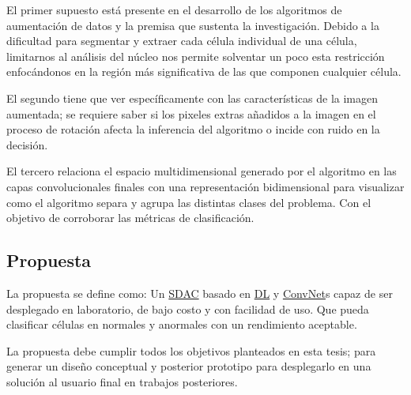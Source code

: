 El primer supuesto está presente en el desarrollo de los algoritmos de
aumentación de datos y la premisa que sustenta la investigación. Debido a la
dificultad para segmentar y extraer cada célula individual de una célula,
limitarnos al análisis del núcleo nos permite solventar un poco esta restricción
enfocándonos en la región más significativa de las que componen cualquier
célula. 

El segundo tiene que ver específicamente con las características de la imagen
aumentada; se requiere saber si los pixeles extras añadidos a la imagen en el
proceso de rotación afecta la inferencia del algoritmo o incide con ruido en la
decisión.

El tercero relaciona el espacio multidimensional generado por el algoritmo en
las capas convolucionales finales con una representación bidimensional para
visualizar como el algoritmo separa y agrupa las distintas clases del problema.
Con el objetivo de corroborar las métricas de clasificación.

\subsection{Propuesta}

La propuesta se define como: Un \hyperlink{abbr}{SDAC} basado en
\hyperlink{abbr}{DL} y \hyperlink{abbr}{ConvNet}s capaz de ser desplegado en
laboratorio, de bajo costo y con facilidad de uso. Que pueda clasificar células
en normales y anormales con un rendimiento aceptable.

La propuesta debe cumplir todos los objetivos planteados en esta tesis; para
generar un diseño conceptual y posterior prototipo para desplegarlo en una
solución al usuario final en trabajos posteriores.
